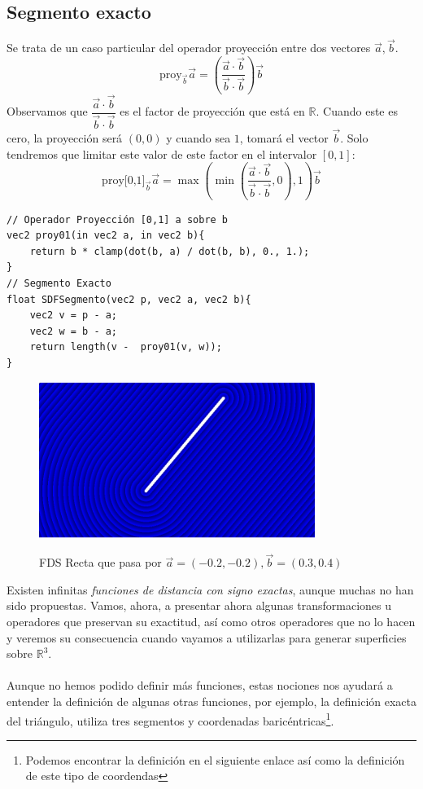\subsection{Segmento exacto}
Se trata de un caso particular del operador proyección entre dos vectores \(\Vec{a}, \Vec{b}\). 
\[ \text{proy}_{\Vec{b}}\Vec{a}=\left(\dfrac{\Vec{a}\cdot \Vec{b}}{\Vec{b}\cdot \Vec{b}}\right)\Vec{b}\]
Observamos que \(\dfrac{\Vec{a}\cdot \Vec{b}}{\Vec{b}\cdot \Vec{b}}\) es el factor de proyección que está en \(\mathbb{R}\). Cuando este es cero, la proyección será \((0,0)\) y cuando sea \(1\), tomará el vector \(\Vec{b}\). Solo tendremos que limitar este valor de este factor en el intervalor \([0,1]\):
\[ \text{proy[0,1]}_{\Vec{b}}\Vec{a}=\max\left(\min\left(\dfrac{\Vec{a}\cdot \Vec{b}}{\Vec{b}\cdot \Vec{b}}, 0\right), 1\right)\Vec{b}\]

\begin{lstlisting}
// Operador Proyección [0,1] a sobre b
vec2 proy01(in vec2 a, in vec2 b){
    return b * clamp(dot(b, a) / dot(b, b), 0., 1.);
}
// Segmento Exacto
float SDFSegmento(vec2 p, vec2 a, vec2 b){
    vec2 v = p - a;
    vec2 w = b - a;
    return length(v -  proy01(v, w));
}
\end{lstlisting}

\begin{figure}[H]
  \centering
  \captionsetup{justification=centering}%
  \includegraphics[width=0.8\textwidth]{secciones/imagenes/sdf/2d/sdf_segmento.png}\label{fig:segmento}
  \caption{FDS Recta que pasa por \(\Vec{a}=(-0.2, -0.2), \Vec{b}=(0.3, 0.4)\)}
\end{figure}

Existen infinitas \textit{funciones de distancia con signo exactas}, aunque muchas no han sido propuestas. Vamos, ahora, a presentar ahora algunas transformaciones u operadores que preservan su exactitud, así como otros operadores que no lo hacen y veremos su consecuencia cuando vayamos a utilizarlas para generar superficies sobre \(\mathbb{R}^3\).\\\\
Aunque no hemos podido definir más funciones, estas nociones nos ayudará a entender la definición de algunas otras funciones, por ejemplo, la definición exacta del triángulo, utiliza tres segmentos y coordenadas baricéntricas\footnote{Podemos encontrar la definición en el siguiente enlace así como la definición de este tipo de coordendas}.

